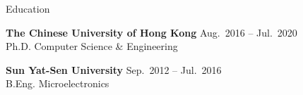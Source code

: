 

\begin{rSection}{Education}

{\bf The Chinese University of Hong Kong} \hfill { Aug.~2016 -- Jul.~2020}\\
Ph.D. \quad Computer Science \& Engineering

{\bf Sun Yat-Sen University} \hfill { Sep.~2012 -- Jul.~2016}\\
B.Eng. \quad Microelectronics
\end{rSection}

